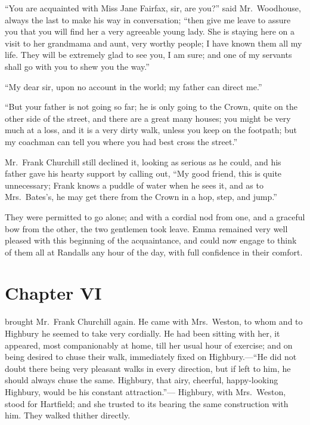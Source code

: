 ``You are acquainted with Miss Jane Fairfax, sir, are you?''
said Mr.\ Woodhouse, always the last to make his way in conversation;
``then give me leave to assure you that you will find her a very
agreeable young lady.  She is staying here on a visit to her grandmama
and aunt, very worthy people; I have known them all my life.
They will be extremely glad to see you, I am sure; and one of my
servants shall go with you to shew you the way.''

``My dear sir, upon no account in the world; my father can direct me.''

``But your father is not going so far; he is only going to the Crown,
quite on the other side of the street, and there are a great many houses;
you might be very much at a loss, and it is a very dirty walk,
unless you keep on the footpath; but my coachman can tell you
where you had best cross the street.''

Mr.\ Frank Churchill still declined it, looking as serious as he could,
and his father gave his hearty support by calling out, ``My good friend,
this is quite unnecessary; Frank knows a puddle of water when he
sees it, and as to Mrs.\ Bates's, he may get there from the Crown
in a hop, step, and jump.''

They were permitted to go alone; and with a cordial nod from one,
and a graceful bow from the other, the two gentlemen took leave.
Emma remained very well pleased with this beginning of the acquaintance,
and could now engage to think of them all at Randalls any hour of
the day, with full confidence in their comfort.



\chapter{Chapter VI}


 brought Mr.\ Frank Churchill again.  He came with
Mrs.\ Weston, to whom and to Highbury he seemed to take very cordially.
He had been sitting with her, it appeared, most companionably at home,
till her usual hour of exercise; and on being desired to chuse
their walk, immediately fixed on Highbury.---``He did not doubt there
being very pleasant walks in every direction, but if left to him,
he should always chuse the same.  Highbury, that airy, cheerful,
happy-looking Highbury, would be his constant attraction.''---%
Highbury, with Mrs.\ Weston, stood for Hartfield; and she trusted to
its bearing the same construction with him.  They walked thither directly.

